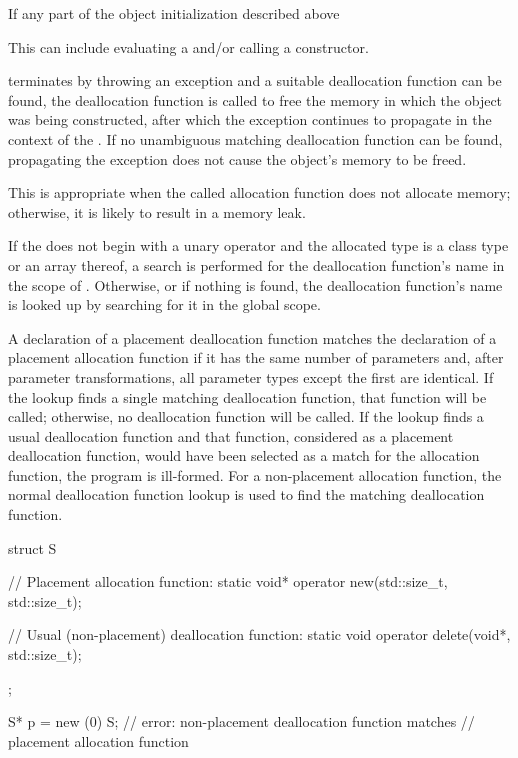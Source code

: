\pnum
{}%
If any part of the object initialization described above%
\begin{footnote}
This can
include evaluating a  and/or calling
a constructor.
\end{footnote}
terminates by throwing an exception and a suitable deallocation function
can be found, the deallocation function is called to free the memory in
which the object was being constructed, after which the exception
continues to propagate in the context of the .
If no unambiguous matching deallocation function can be found,
propagating the exception does not cause the object's memory to be
freed.
\begin{note}
This is appropriate when the called allocation function does not
allocate memory; otherwise, it is likely to result in a memory leak.
\end{note}

\pnum
If the  does not begin with
a unary \tcode{::} operator and
the allocated type is a class type  or an array thereof,
a search is performed for the deallocation function's name
in the scope of .
Otherwise, or if nothing is found,
the deallocation function's name is looked up by
searching for it in the global scope.

\pnum
A declaration of a placement deallocation function matches the
declaration of a placement allocation function if it has the same number
of parameters and, after parameter transformations, all
parameter types except the first are identical. If
the lookup finds a single matching deallocation function, that function
will be called; otherwise, no deallocation function will be called. If
the lookup finds a usual deallocation
function
and that function,
considered as a placement deallocation function, would have been
selected as a match for the allocation function, the program is
ill-formed. For a non-placement allocation function, the normal deallocation
function lookup is used to find the matching deallocation
function.
\begin{example}
\begin{codeblock}
struct S {
  // Placement allocation function:
  static void* operator new(std::size_t, std::size_t);

  // Usual (non-placement) deallocation function:
  static void operator delete(void*, std::size_t);
};

S* p = new (0) S;   // error: non-placement deallocation function matches
                    // placement allocation function
\end{codeblock}

\end{example}

